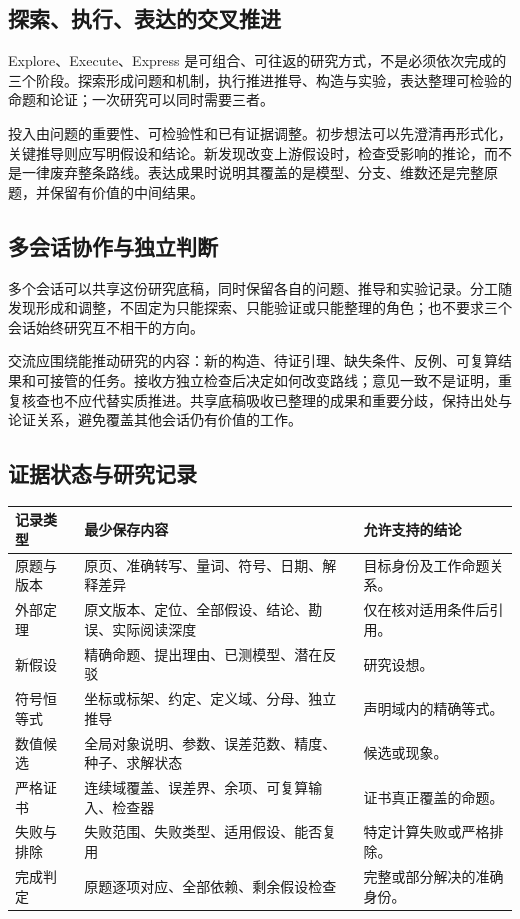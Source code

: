 \documentclass[11pt,a4paper]{article}
\theoremstyle{definition}
\begin{document}
\subsection{探索、执行、表达的交叉推进}

Explore、Execute、Express 是可组合、可往返的研究方式，不是必须依次完成的三个阶段。探索形成问题和机制，执行推进推导、构造与实验，表达整理可检验的命题和论证；一次研究可以同时需要三者。

投入由问题的重要性、可检验性和已有证据调整。初步想法可以先澄清再形式化，关键推导则应写明假设和结论。新发现改变上游假设时，检查受影响的推论，而不是一律废弃整条路线。表达成果时说明其覆盖的是模型、分支、维数还是完整原题，并保留有价值的中间结果。

\subsection{多会话协作与独立判断}

多个会话可以共享这份研究底稿，同时保留各自的问题、推导和实验记录。分工随发现形成和调整，不固定为只能探索、只能验证或只能整理的角色；也不要求三个会话始终研究互不相干的方向。

交流应围绕能推动研究的内容：新的构造、待证引理、缺失条件、反例、可复算结果和可接管的任务。接收方独立检查后决定如何改变路线；意见一致不是证明，重复核查也不应代替实质推进。共享底稿吸收已整理的成果和重要分歧，保持出处与论证关系，避免覆盖其他会话仍有价值的工作。

\subsection{证据状态与研究记录}

\begin{longtable}{P{0.21\textwidth}P{0.43\textwidth}P{0.27\textwidth}}
\toprule
记录类型 & 最少保存内容 & 允许支持的结论\\\midrule\endhead
原题与版本 & 原页、准确转写、量词、符号、日期、解释差异 & 目标身份及工作命题关系。\\
外部定理 & 原文版本、定位、全部假设、结论、勘误、实际阅读深度 & 仅在核对适用条件后引用。\\
新假设 & 精确命题、提出理由、已测模型、潜在反驳 & 研究设想。\\
符号恒等式 & 坐标或标架、约定、定义域、分母、独立推导 & 声明域内的精确等式。\\
数值候选 & 全局对象说明、参数、误差范数、精度、种子、求解状态 & 候选或现象。\\
严格证书 & 连续域覆盖、误差界、余项、可复算输入、检查器 & 证书真正覆盖的命题。\\
失败与排除 & 失败范围、失败类型、适用假设、能否复用 & 特定计算失败或严格排除。\\
完成判定 & 原题逐项对应、全部依赖、剩余假设检查 & 完整或部分解决的准确身份。\\\bottomrule
\end{longtable}
\end{document}
